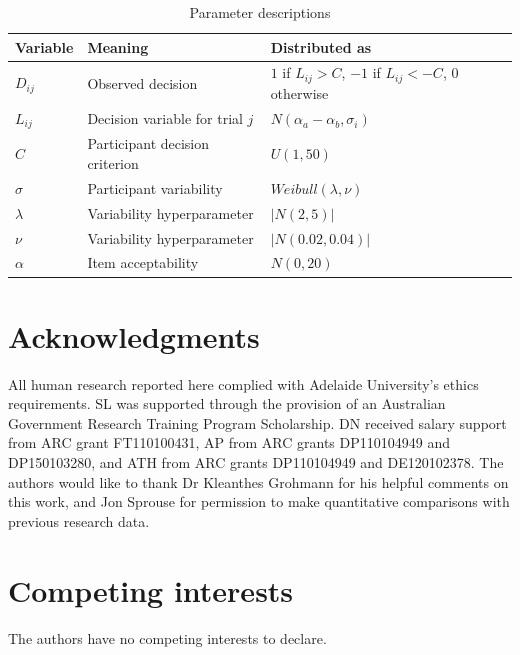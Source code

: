 \documentclass[doc]{apa6}
\begin{document}
\begin{table}
  \caption{Parameter descriptions}
  \label{modelnotation}
  \centering
  \begin{tabular}{lll}  %
  Variable    & Meaning & Distributed as \\ \hline

  $D_{ij}$ & Observed decision & $1$ if $L_{ij}>C$, $-1$ if $L_{ij}< -C$, 0 otherwise \\

  $L_{ij}$ & Decision variable for trial $j$ & $N(\alpha_a-\alpha_b,\sigma_i)$ \\
  $C$ & Participant decision criterion & $U(1,50)$ \\
  $\sigma$ & Participant variability & $Weibull(\lambda,\nu)$ \\
  $\lambda$ & Variability hyperparameter & $\lvert N(2,5) \rvert$ \\
  $\nu$ & Variability hyperparameter & $\lvert N(0.02,0.04) \rvert$ \\
  $\alpha$ & Item acceptability  & $N(0,20)$ \\
  \end{tabular}
\end{table}


\section*{Acknowledgments}
All human research reported here complied with Adelaide University's ethics requirements. SL was supported through the provision of an Australian Government Research Training Program Scholarship. DN received salary support from ARC grant FT110100431, AP from ARC grants DP110104949 and DP150103280, and ATH from ARC grants DP110104949 and DE120102378.
The authors would like to thank Dr Kleanthes Grohmann for his helpful comments on this work, and Jon Sprouse for permission to make quantitative comparisons with previous research data.

\section*{Competing interests}
The authors have no competing interests to declare.



\end{document}
